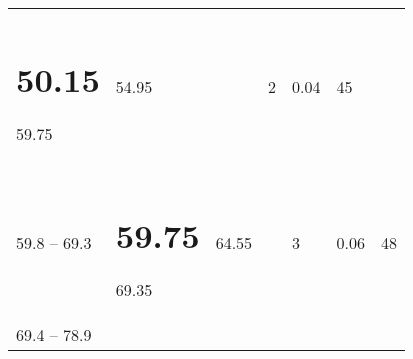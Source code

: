\documentclass[]{book}
\begin{document}
\begin{longtable}[]{@{}lllllll@{}}
\begin{minipage}[t]{0.11\columnwidth}
{\section{50.15}\label{section-4}}

59.75\strut
\end{minipage} & \begin{minipage}[t]{0.11\columnwidth}\raggedright
54.95\strut
\end{minipage} & \begin{minipage}[t]{0.11\columnwidth}\raggedright
\strut
\end{minipage} & \begin{minipage}[t]{0.11\columnwidth}\raggedright
2\strut
\end{minipage} & \begin{minipage}[t]{0.11\columnwidth}\raggedright
0.04\strut
\end{minipage} & \begin{minipage}[t]{0.11\columnwidth}\raggedright
45\strut
\end{minipage}\tabularnewline
\begin{minipage}[t]{0.11\columnwidth}\raggedright
59.8 --
69.3\strut
\end{minipage} & \begin{minipage}[t]{0.11\columnwidth}\raggedright
\hypertarget{section-5}{%
\section{59.75}\label{section-5}}

69.35\strut
\end{minipage} & \begin{minipage}[t]{0.11\columnwidth}\raggedright
64.55\strut
\end{minipage} & \begin{minipage}[t]{0.11\columnwidth}\raggedright
~\strut
\end{minipage} & \begin{minipage}[t]{0.11\columnwidth}\raggedright
3\strut
\end{minipage} & \begin{minipage}[t]{0.11\columnwidth}\raggedright
0.06\strut
\end{minipage} & \begin{minipage}[t]{0.11\columnwidth}\raggedright
48\strut
\end{minipage}\tabularnewline
\begin{minipage}[t]{0.11\columnwidth}\raggedright
69.4 --
78.9\strut
\end{minipage} & \begin{minipage}[t]{0.11\columnwidth}\raggedright
\hypertarget{section-6}{%
}
\end{minipage}
\end{longtable}
\end{document}
